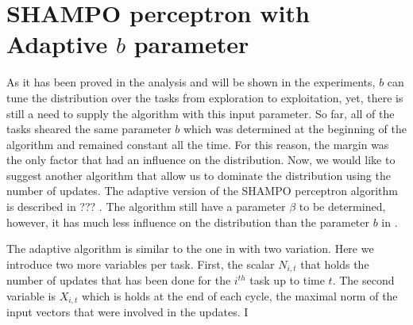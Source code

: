 \section{SHAMPO perceptron with Adaptive $b$ parameter}

As it has been proved in the analysis and will be shown in the experiments, $b$ can tune the distribution over the tasks from exploration to exploitation, yet, there is still a need to supply the algorithm with this input parameter. So far, all of the tasks sheared the same parameter $b$ which was determined at the beginning of the algorithm and remained constant all the time. For this reason, the margin was the only factor that had an influence on the distribution. Now, we would like to suggest another algorithm that allow us to  dominate the distribution using the number of updates. The adaptive version of the  SHAMPO perceptron algorithm is  described in  ??? . The algorithm still have a parameter $\beta$ to be determined, however, it has much less influence on the distribution than the parameter $b$ in  .

The adaptive algorithm is similar to the one in  with two variation. Here we introduce two more variables per task. First, the scalar $N_{i,t}$ that holds the number of updates that has been done for the $i^{th}$ task  up to time $t$. The second variable is $X_{i,t}$ which is holds at the end of each cycle,  the maximal norm of the input vectors that were involved in the updates. I

